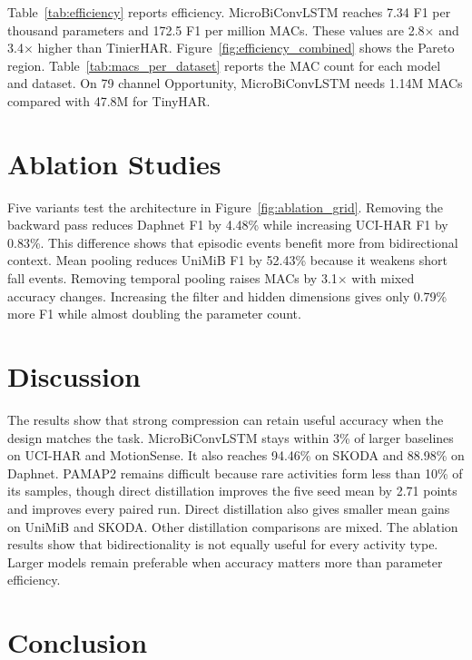 \documentclass[conference,twocolumn]{IEEEtran}
\newcommand{\modelname}{MicroBiConvLSTM}
\begin{document}
Table~\ref{tab:efficiency} reports efficiency. \modelname{} reaches 7.34 F1 per thousand parameters and 172.5 F1 per million MACs. These values are 2.8$\times$ and 3.4$\times$ higher than TinierHAR. Figure~\ref{fig:efficiency_combined} shows the Pareto region. Table~\ref{tab:macs_per_dataset} reports the MAC count for each model and dataset. On 79 channel Opportunity, \modelname{} needs 1.14M MACs compared with 47.8M for TinyHAR.

\FloatBarrier
\newpage

\section{Ablation Studies}\vspace{-1mm}
\label{sec:ablation}

Five variants test the architecture in Figure~\ref{fig:ablation_grid}. Removing the backward pass reduces Daphnet F1 by 4.48\% while increasing UCI-HAR F1 by 0.83\%. This difference shows that episodic events benefit more from bidirectional context. Mean pooling reduces UniMiB F1 by 52.43\% because it weakens short fall events. Removing temporal pooling raises MACs by 3.1$\times$ with mixed accuracy changes. Increasing the filter and hidden dimensions gives only 0.79\% more F1 while almost doubling the parameter count.

\section{Discussion}

The results show that strong compression can retain useful accuracy when the design matches the task. \modelname{} stays within 3\% of larger baselines on UCI-HAR and MotionSense. It also reaches 94.46\% on SKODA and 88.98\% on Daphnet. PAMAP2 remains difficult because rare activities form less than 10\% of its samples, though direct distillation improves the five seed mean by 2.71 points and improves every paired run. Direct distillation also gives smaller mean gains on UniMiB and SKODA. Other distillation comparisons are mixed. The ablation results show that bidirectionality is not equally useful for every activity type. Larger models remain preferable when accuracy matters more than parameter efficiency.

\section{Conclusion}
\end{document}
